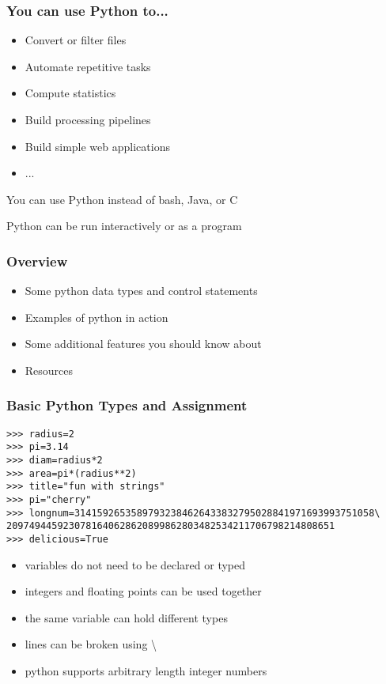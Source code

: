 \documentclass[10pt]{beamer}
\newcommand\smallfont{\fontsize{8pt}{7.2}\selectfont}
\begin{document}
\begin{frame}
\frametitle{You can use Python to...}
\begin{itemize}
\item Convert or filter files
\item Automate repetitive tasks
\item Compute statistics
\item Build processing pipelines
\item Build simple web applications
\item ...
\end{itemize}

You can use Python instead of bash, Java, or C
\vspace{2mm}

Python can be run interactively or as a program
\end{frame}

\begin{frame}
\frametitle{Overview}
\begin{itemize}
\item Some python data types and control statements
\item Examples of python in action
\item Some additional features you should know about
\item Resources
\end{itemize}
\end{frame}
\begin{frame}[fragile]
\frametitle{Basic Python Types and Assignment}

\smallfont
\begin{verbatim}
>>> radius=2
>>> pi=3.14
>>> diam=radius*2
>>> area=pi*(radius**2)
>>> title="fun with strings"
>>> pi="cherry"
>>> longnum=31415926535897932384626433832795028841971693993751058\
2097494459230781640628620899862803482534211706798214808651
>>> delicious=True
\end{verbatim}

\begin{itemize}
\item variables do not need to be declared or typed
\item integers and floating points can be used together
\item the same variable can hold different types
\item lines can be broken using \textbackslash
\item python supports arbitrary length integer numbers
\end{itemize}
\end{frame}
\end{document}
